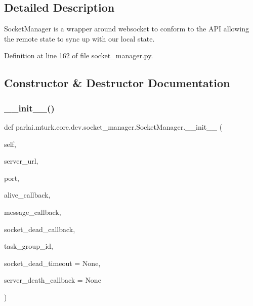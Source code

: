 \subsection{Detailed Description}
\begin{DoxyVerb}SocketManager is a wrapper around websocket to conform to the API allowing the
remote state to sync up with our local state.
\end{DoxyVerb}
 

Definition at line 162 of file socket\+\_\+manager.\+py.



\subsection{Constructor \& Destructor Documentation}
\mbox{\label{classparlai_1_1mturk_1_1core_1_1dev_1_1socket__manager_1_1SocketManager_a972e94d9fa6b2a7fdc09184e06d343dd}} 
\subsubsection{\texorpdfstring{\+\_\+\+\_\+init\+\_\+\+\_\+()}{\_\_init\_\_()}}
{\footnotesize\ttfamily def parlai.\+mturk.\+core.\+dev.\+socket\+\_\+manager.\+Socket\+Manager.\+\_\+\+\_\+init\+\_\+\+\_\+ (\begin{DoxyParamCaption}\item[{}]{self,  }\item[{}]{server\+\_\+url,  }\item[{}]{port,  }\item[{}]{alive\+\_\+callback,  }\item[{}]{message\+\_\+callback,  }\item[{}]{socket\+\_\+dead\+\_\+callback,  }\item[{}]{task\+\_\+group\+\_\+id,  }\item[{}]{socket\+\_\+dead\+\_\+timeout = {\ttfamily None},  }\item[{}]{server\+\_\+death\+\_\+callback = {\ttfamily None} }\end{DoxyParamCaption})}

